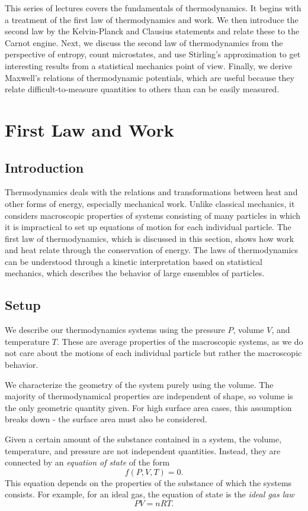 
\setcounter{law}{1}

This series of lectures covers the fundamentals of thermodynamics. It begins with a treatment of the first law of thermodynamics and work. We then introduce the second law by the Kelvin-Planck and Clausius statements and relate these to the Carnot engine. Next, we discuss the second law of thermodynamics from the perspective of entropy, count microstates, and use Stirling's approximation to get interesting results from a statistical mechanics point of view. Finally, we derive Maxwell's relations of thermodynamic potentials, which are useful because they relate difficult-to-measure quantities to others than can be easily measured. 

\section{First Law and Work}
\subsection{Introduction}
Thermodynamics deals with the relations and transformations between heat and other forms of energy, especially mechanical work. Unlike classical mechanics, it considers macroscopic properties of systems consisting of many particles in which it is impractical to set up equations of motion for each individual particle. The first law of thermodynamics, which is discussed in this section, shows how work and heat relate through the conservation of energy. The laws of thermodynamics can be understood through a kinetic interpretation based on statistical mechanics, which describes the behavior of large ensembles of particles.
\subsection{Setup}
We describe our thermodynamics systems using the pressure $P$, volume $V$, and temperature $T$. These are average properties of the macroscopic systems, as we do not care about the motions of each individual particle but rather the macroscopic behavior. 

We characterize the geometry of the system purely using the volume. The majority of thermodynamical properties are independent of shape, so volume is the only geometric quantity given. For high surface area cases, this assumption breaks down - the surface area must also be considered.

Given a certain amount of the substance contained in a system, the volume, temperature, and pressure are not independent quantities. Instead, they are connected by an \textit{equation of state} of the form $$f(P,V,T) = 0.$$ This equation depends on the properties of the substance of which the systems consists. For example, for an ideal gas, the equation of state is the \textit{ideal gas law} $$PV = nRT.$$

